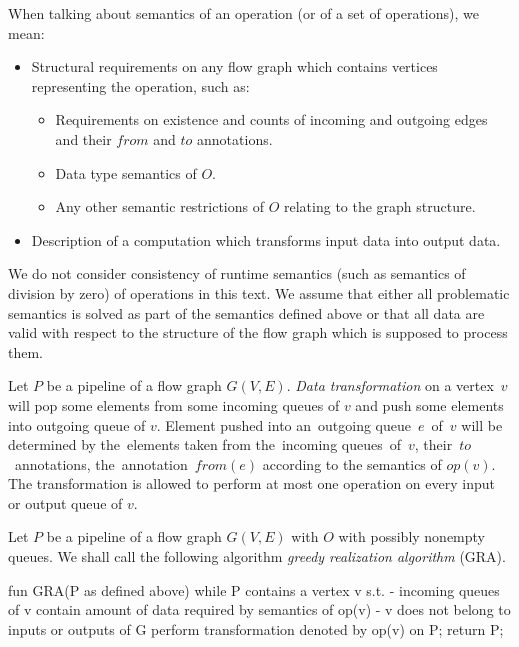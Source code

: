 \begin{define}
  When talking about semantics of an operation (or of a set of operations), we mean:
  \begin{itemize}
    \item Structural requirements on any flow graph which contains vertices representing the operation, such as:
    \begin{itemize}
      \item Requirements on existence and counts of incoming and outgoing edges and their $from$ and $to$ annotations.
      \item Data type semantics of $O$.
      \item Any other semantic restrictions of $O$ relating to the graph structure. 
    \end{itemize}
    \item Description of a computation which transforms input data into output data.
  \end{itemize}
\end{define}

  We do not consider consistency of runtime semantics (such as semantics of division by zero) of operations in this text. We assume that either all problematic semantics is solved as part of the semantics defined above or that all data are valid with respect to the structure of the flow graph which is supposed to process them.


\begin{define}
  Let $P$ be a pipeline of a flow graph $G(V,E)$. \emph{Data transformation} on a vertex~$v$ will pop some elements from some incoming queues of $v$ and push some elements into outgoing queue of $v$. Element pushed into an~outgoing queue~$e$~of~$v$ will be determined by the~elements taken from the~incoming queues~of~$v$, their~$to$~annotations, the~annotation~$from(e)$ according to the semantics of $op(v)$. The transformation is allowed to perform at most one operation on every input or output queue of $v$.
\end{define}


\begin{define}
  Let $P$ be a pipeline of a flow graph $G(V,E)$ with $O$ with possibly nonempty queues. We shall call the following algorithm \emph{greedy realization algorithm} (GRA).
\end{define}
  \begin{code}
fun GRA(P as defined above)
{
  while P contains a vertex v s.t. 
    - incoming queues of v contain amount of data 
               required by semantics of op(v) 
    - v does not belong to inputs or outputs of G
  {
    perform transformation denoted by op(v) on P;
  }
  return P;  
}
  \end{code}


